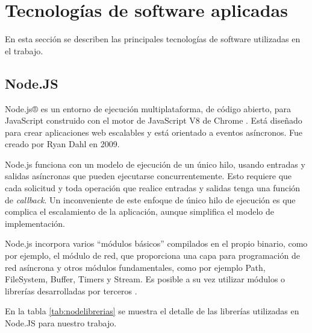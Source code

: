 \pagebreak
\section{Tecnologías de software aplicadas}
 
En esta sección se describen las principales tecnologías de software utilizadas en el trabajo.

\subsection{Node.JS}

Node.js® es un entorno de ejecución multiplataforma, de código abierto, para JavaScript construido con el motor de JavaScript V8 de Chrome \citep{WEBSITE:node}. Está diseñado para crear aplicaciones web escalables y está orientado a eventos asíncronos. Fue creado por Ryan Dahl en 2009.

Node.js funciona con un modelo de ejecución de un único hilo, usando entradas y salidas asíncronas que pueden ejecutarse concurrentemente. Esto requiere que cada solicitud y toda operación que realice entradas y salidas tenga una función de \textit{callback}. Un inconveniente de este enfoque de único hilo de ejecución es que complica el escalamiento de la aplicación, aunque simplifica el modelo de implementación.

Node.js incorpora varios ``módulos básicos'' compilados en el propio binario, como por ejemplo, el módulo de red, que proporciona una capa para programación de red asíncrona y otros módulos fundamentales, como por ejemplo Path, FileSystem, Buffer, Timers y Stream. Es posible a su vez utilizar módulos o librerías desarrolladas por terceros \citep{WEBSITE:nodeWiki}.

En la tabla \ref{tab:nodelibrerias} se muestra el detalle de las librerías utilizadas en Node.JS para nuestro trabajo.


